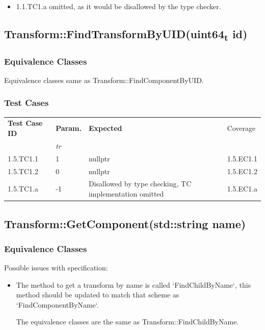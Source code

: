 \documentclass[11pt]{article}
\begin{document}
\begin{itemize}
\item 1.1.TC1.a omitted, as it would be disallowed by the type checker.
\end{itemize}
\subsection{Transform::FindTransformByUID(uint64\textsubscript{t} id)}
\label{sec:org509a155}

\subsubsection*{Equivalence Classes}
\label{sec:org70c832f}
Equivalence classes same as Transform::FindComponentByUID.
\subsubsection*{Test Cases}
\label{sec:org3a25389}
\begin{center}
\begin{tabularx}{\textwidth}{lXXX}
\hline
\textbf{Test Case ID} & \textbf{Param.} & \textbf{Expected} & Coverage\\
 & \textit{tr} &  & \\
\hline
1.5.TC1.1 & 1 & nullptr & 1.5.EC1.1\\
\hline
1.5.TC1.2 & 0 & nullptr & 1.5.EC1.2\\
\hline
1.5.TC1.a & -1 & Disallowed by type checking, TC implementation omitted & 1.5.EC1.a\\
\hline
\end{tabularx}
\end{center}
\subsection{Transform::GetComponent(std::string name)}
\label{sec:orgd00d5e4}

\subsubsection*{Equivalence Classes}
\label{sec:orgac6308a}
Possible issues with specification:
\begin{itemize}
\item The method to get a transform by name is called `FindChildByName`, this method should be updated to match that scheme as `FindComponentByName`.

The equivalence classes are the same as Transform::FindChildByName.
\end{itemize}
\end{document}
